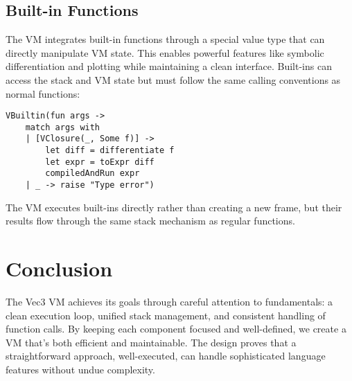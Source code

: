 \subsection{Built-in Functions}
The VM integrates built-in functions through a special value type that can directly manipulate VM state. This enables powerful features like symbolic differentiation and plotting while maintaining a clean interface. Built-ins can access the stack and VM state but must follow the same calling conventions as normal functions:
\begin{verbatim}
VBuiltin(fun args ->
    match args with
    | [VClosure(_, Some f)] ->
        let diff = differentiate f
        let expr = toExpr diff
        compiledAndRun expr
    | _ -> raise "Type error")
\end{verbatim}
The VM executes built-ins directly rather than creating a new frame, but their results flow through the same stack mechanism as regular functions.
\section{Conclusion}
The Vec3 VM achieves its goals through careful attention to fundamentals: a clean execution loop, unified stack management, and consistent handling of function calls. By keeping each component focused and well-defined, we create a VM that's both efficient and maintainable. The design proves that a straightforward approach, well-executed, can handle sophisticated language features without undue complexity.
